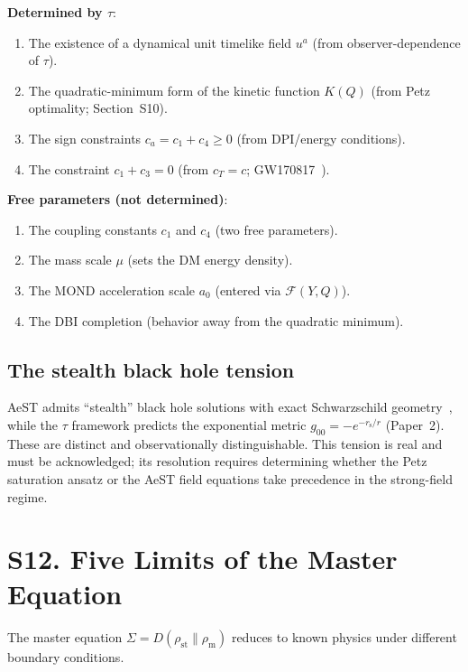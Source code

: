 \documentclass[aps,prd,preprint,superscriptaddress,longbibliography]{revtex4-2}
\newcommand{\KL}{D}
\newcommand{\tauasym}{\tau}
\newcommand{\rs}{r_{\mathrm{s}}}
\newcommand{\azero}{a_0}
\begin{document}
\textbf{Determined by $\tauasym$}:
\begin{enumerate}
\item The existence of a dynamical unit timelike field $u^a$ (from
  observer-dependence of $\tauasym$).
\item The quadratic-minimum form of the kinetic function $K(Q)$
  (from Petz optimality; Section~S10).
\item The sign constraints $c_a = c_1+c_4 \ge 0$ (from DPI/energy
  conditions).
\item The constraint $c_1+c_3 = 0$ (from $c_T = c$;
  GW170817~\cite{GW170817}).
\end{enumerate}

\textbf{Free parameters (not determined)}:
\begin{enumerate}
\item The coupling constants $c_1$ and $c_4$ (two free parameters).
\item The mass scale $\mu$ (sets the DM energy density).
\item The MOND acceleration scale $\azero$ (entered via $\mathcal{F}(Y,Q)$).
\item The DBI completion (behavior away from the quadratic minimum).
\end{enumerate}

\subsection{The stealth black hole tension}

AeST admits ``stealth'' black hole solutions with exact
Schwarzschild geometry~\cite{SkordisVokrouhlicky2024}, while the
$\tauasym$ framework predicts the exponential metric
$g_{00} = -e^{-\rs/r}$ (Paper~2).  These are distinct and
observationally distinguishable.  This tension is real and must be
acknowledged; its resolution requires determining whether the Petz
saturation ansatz or the AeST field equations take precedence in the
strong-field regime.

\section{S12. Five Limits of the Master Equation}
\label{sec:five_limits}

The master equation
$\Sigma = \KL(\rho_{\mathrm{st}}\|\rho_{\mathrm{m}})$ reduces to
known physics under different boundary conditions.
\end{document}
